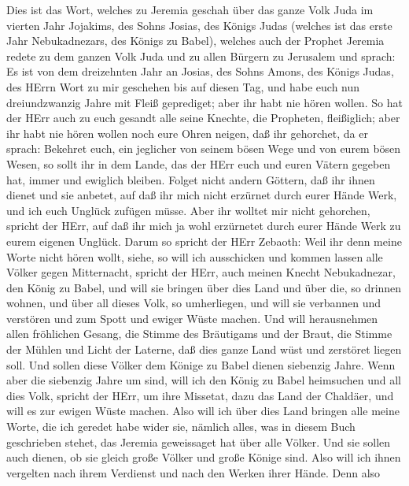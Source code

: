 Dies ist das Wort, welches zu Jeremia geschah über das
ganze Volk Juda im vierten Jahr Jojakims, des Sohns Josias, des Königs
Judas (welches ist das erste Jahr Nebukadnezars, des Königs zu Babel),
 welches auch der Prophet Jeremia redete zu dem ganzen Volk
Juda und zu allen Bürgern zu Jerusalem und sprach:  Es ist
von dem dreizehnten Jahr an Josias, des Sohns Amons, des Königs Judas,
des HErrn Wort zu mir geschehen bis auf diesen Tag, und habe euch nun
dreiundzwanzig Jahre mit Fleiß geprediget; aber ihr habt nie hören
wollen.  So hat der HErr auch zu euch gesandt alle seine
Knechte, die Propheten, fleißiglich; aber ihr habt nie hören wollen noch
eure Ohren neigen, daß ihr gehorchet,  da er sprach:
Bekehret euch, ein jeglicher von seinem bösen Wege und von eurem bösen
Wesen, so sollt ihr in dem Lande, das der HErr euch und euren Vätern
gegeben hat, immer und ewiglich bleiben.  Folget nicht
andern Göttern, daß ihr ihnen dienet und sie anbetet, auf daß ihr mich
nicht erzürnet durch eurer Hände Werk, und ich euch Unglück zufügen
müsse.  Aber ihr wolltet mir nicht gehorchen, spricht der
HErr, auf daß ihr mich ja wohl erzürnetet durch eurer Hände Werk zu
eurem eigenen Unglück.  Darum so spricht der HErr Zebaoth:
Weil ihr denn meine Worte nicht hören wollt,  siehe, so will
ich ausschicken und kommen lassen alle Völker gegen Mitternacht, spricht
der HErr, auch meinen Knecht Nebukadnezar, den König zu Babel, und will
sie bringen über dies Land und über die, so drinnen wohnen, und über all
dieses Volk, so umherliegen, und will sie verbannen und verstören und
zum Spott und ewiger Wüste machen.  Und will herausnehmen
allen fröhlichen Gesang, die Stimme des Bräutigams und der Braut, die
Stimme der Mühlen und Licht der Laterne,  daß dies ganze
Land wüst und zerstöret liegen soll. Und sollen diese Völker dem Könige
zu Babel dienen siebenzig Jahre.  Wenn aber die siebenzig
Jahre um sind, will ich den König zu Babel heimsuchen und all dies Volk,
spricht der HErr, um ihre Missetat, dazu das Land der Chaldäer, und will
es zur ewigen Wüste machen.  Also will ich über dies Land
bringen alle meine Worte, die ich geredet habe wider sie, nämlich alles,
was in diesem Buch geschrieben stehet, das Jeremia geweissaget hat über
alle Völker.  Und sie sollen auch dienen, ob sie gleich
große Völker und große Könige sind. Also will ich ihnen vergelten nach
ihrem Verdienst und nach den Werken ihrer Hände.  Denn also
